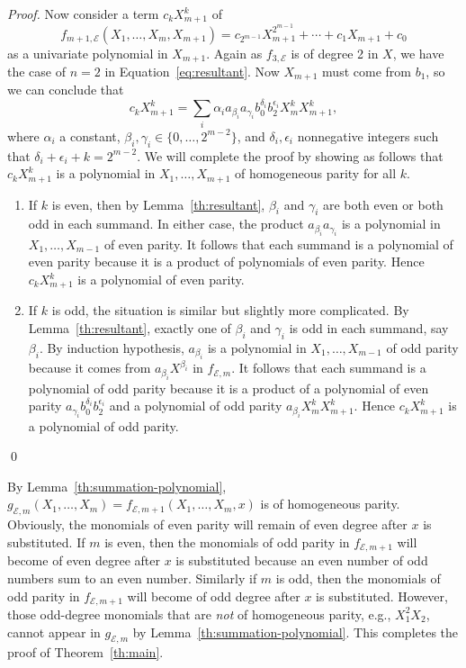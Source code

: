 \begin{proof}
  Now consider a term $c_kX_{m+1}^k$ of
  \[ f_{m+1,\mathcal
      E}(X_1,\ldots,X_m,X_{m+1})=c_{2^{m-1}}X_{m+1}^{2^{m-1}}+\cdots+c_1X_{m+1}+c_0 \]
  as a univariate polynomial in $X_{m+1}$.
  Again as $f_{3,\mathcal E}$ is of degree 2 in $X$, we have the case
  of $n=2$ in Equation~\ref{eq:resultant}.
  Now $X_{m+1}$ must come from $b_1$, so we can conclude that
  \[ c_kX_{m+1}^k=\sum_i\alpha_i a_{\beta_i} a_{\gamma_i}
    b_0^{\delta_i} b_2^{\epsilon_i} X_m^kX_{m+1}^k, \] where
  $\alpha_i$ a constant, $\beta_i,\gamma_i\in\{0,\ldots,2^{m-2}\}$,
  and $\delta_i,\epsilon_i$ nonnegative integers such that
  $\delta_i+\epsilon_i+k=2^{m-2}$.
  We will complete the proof by showing as follows that $c_kX_{m+1}^k$
  is a polynomial in $X_1,\ldots,X_{m+1}$ of homogeneous parity for
  all $k$.
  \begin{enumerate}
  \item If $k$ is even, then by Lemma~\ref{th:resultant},  $\beta_i$
    and $\gamma_i$ are both even or both odd in each summand.
    In either case, the product $a_{\beta_i}a_{\gamma_i}$ is a
    polynomial in $X_1,\ldots,X_{m-1}$ of even parity.
    It follows that each summand is a polynomial of even parity
    because it is a product of polynomials of even parity.
    Hence $c_kX_{m+1}^k$ is a polynomial of even parity.
  \item If $k$ is odd, the situation is similar but slightly more
    complicated.
    By Lemma~\ref{th:resultant}, exactly one of $\beta_i$ and
    $\gamma_i$ is odd in each summand, say $\beta_i$.
    By induction hypothesis, $a_{\beta_i}$ is a polynomial in
    $X_1,\ldots,X_{m-1}$ of odd parity because it comes from
    $a_{\beta_i} X^{\beta_i}$ in $f_{\mathcal E,m}$.
    It follows that each summand is a polynomial of odd parity because
    it is a product of a polynomial of even parity
    $a_{\gamma_i} b_0^{\delta_i} b_2^{\epsilon_i}$ and a polynomial of
    odd parity $a_{\beta_i} X_m^kX_{m+1}^k$.
    Hence $c_kX_{m+1}^k$ is a polynomial of odd parity.
  \end{enumerate}
  \qed
\end{proof}

By Lemma~\ref{th:summation-polynomial},
$g_{\mathcal E,m}(X_1,\ldots,X_m)=f_{\mathcal
  E,m+1}(X_1,\ldots,X_m,x)$ is of homogeneous parity.
%
Obviously, the monomials of even parity will remain of even degree
after $x$ is substituted.
%
If $m$ is even, then the monomials of odd parity in
$f_{\mathcal E,m+1}$ will become of even degree after $x$ is
substituted because an even number of odd numbers sum to an even
number.
%
Similarly if $m$ is odd, then the monomials of odd parity in
$f_{\mathcal E,m+1}$ will become of odd degree after $x$ is
substituted.
%
However, those odd-degree monomials that are \emph{not} of homogeneous
parity, e.g., $X_1^2X_2$, cannot appear in $g_{\mathcal E,m}$ by
Lemma~\ref{th:summation-polynomial}.
%
This completes the proof of Theorem~\ref{th:main}.
